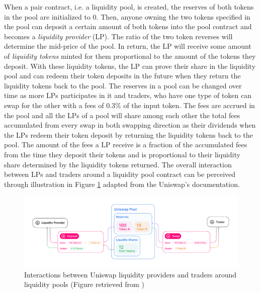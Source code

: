 When a pair contract, i.e. a liquidity pool, is created, the reserves of both tokens in the pool are initialized to 0. Then, anyone owning the two tokens specified in the pool can deposit a certain amount of both tokens into the pool contract and becomes a \textit{liquidity provider} (LP). The ratio of the two token reverses will determine the mid-price of the pool. In return, the LP will receive some amount of \textit{liquidity tokens} minted for them proportional to the amount of the tokens they deposit. With these liquidity tokens, the LP can prove their share in the liquidity pool and can redeem their token deposits in the future when they return the liquidity tokens back to the pool. The reserves in a pool can be changed over time as more LPs participates in it and traders, who have one type of token can swap for the other with a fees of 0.3\% of the input token. The fees are accrued in the pool and all the LPs of a pool will share among each other the total fees accumulated from every swap in both swapping direction as their dividends when the LPs redeem their token deposit by returning the liquidity tokens back to the pool. The amount of the fees a LP receive is a fraction of the accumulated fees from the time they deposit their tokens and is proportional to their liquidity share determined by the liquidity tokens returned. The overall interaction between LPs and traders around a liquidity pool contract can be perceived through illustration in Figure \ref{fig:uniswap} adapted from the Uniswap's documentation.


\begin{figure}
    \centering
  \includegraphics[width=\linewidth]{figures/uniswap-pool.jpg}
  \caption{Interactions between Uniswap liquidity providers and traders around liquidity pools (Figure retrieved from \cite{HowUniswapWorks})}
  \label{fig:uniswap}
\end{figure}

